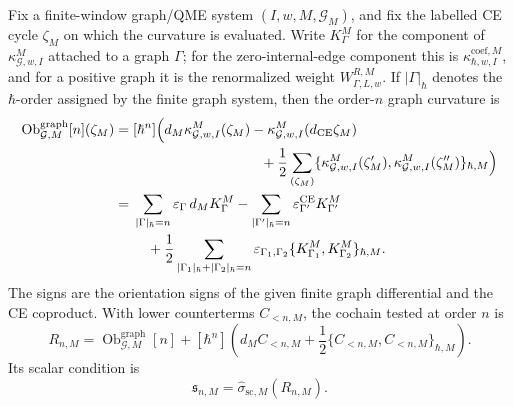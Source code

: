 \begin{thm}\label{thm:finite-window-nonscalar-curvature-criterion}
  Fix a finite-window graph/QME system
  \((I,w,M,\mathcal G_M)\), and fix the labelled CE cycle
  \(\zeta_M\) on which the curvature is evaluated.  Write
  \(K^M_{\Gamma}\) for the component of
  \(\kappa^M_{\mathcal G,w,I}\) attached to a graph
  \(\Gamma\); for the zero-internal-edge component this is
  \(\kappa^{\mathrm{coef},M}_{\hbar,w,I}\), and for a positive graph it
  is the renormalized weight \(W^{R,M}_{\Gamma,L,w}\).  If
  \(|\Gamma|_\hbar\) denotes the \(\hbar\)-order assigned by the finite
  graph system, then the order-\(n\) graph curvature is
  \[
  \begin{aligned}
    \operatorname{Ob}^{\mathrm{graph}}_{\mathcal G,M}[n](\zeta_M)
      ={}&[\hbar^n]\Bigl(
        d_M\kappa^M_{\mathcal G,w,I}(\zeta_M)
        -\kappa^M_{\mathcal G,w,I}(d_{\mathrm{CE}}\zeta_M)\\
      &\hspace{3.2cm}
        +\frac12
        \sum_{(\zeta_M)}
        \{\kappa^M_{\mathcal G,w,I}(\zeta'_M),
          \kappa^M_{\mathcal G,w,I}(\zeta''_M)\}_{\hbar,M}
      \Bigr)                                                     \\
      ={}&
      \sum_{|\Gamma|_\hbar=n}
        \varepsilon_\Gamma\,d_M K^M_\Gamma
      -\sum_{|\Gamma'|_\hbar=n}
        \varepsilon^{\mathrm{CE}}_{\Gamma'}K^M_{\Gamma'}          \\
      &\quad
      +\frac12
      \sum_{|\Gamma_1|_\hbar+|\Gamma_2|_\hbar=n}
        \varepsilon_{\Gamma_1,\Gamma_2}
        \{K^M_{\Gamma_1},K^M_{\Gamma_2}\}_{\hbar,M}.
  \end{aligned}
  \]
  The signs are the orientation signs of the given finite graph
  differential and the CE coproduct.  With lower counterterms
  \(C_{<n,M}\), the cochain tested at order \(n\) is
  \[
    R_{n,M}
      =
    \operatorname{Ob}^{\mathrm{graph}}_{\mathcal G,M}[n]
      +[\hbar^n]\left(
        d_M C_{<n,M}
        +\frac12\{C_{<n,M},C_{<n,M}\}_{\hbar,M}\right).
  \]
  Its scalar condition is
  \[
    \mathfrak s_{n,M}=\widehat\sigma_{\mathrm{sc},M}(R_{n,M}).
  \]


\end{thm}
